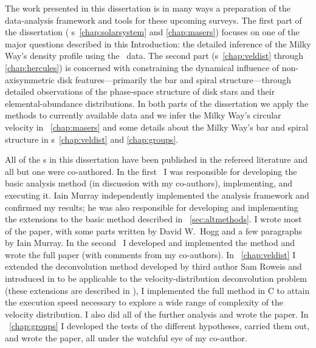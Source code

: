 The work presented in this dissertation is in many ways a preparation
of the data-analysis framework and tools for these upcoming
surveys. The first part of the dissertation (\chaptername
s~\ref{chap:solarsystem} and \ref{chap:masers}) focuses on one of the
major questions described in this Introduction: the detailed inference
of the Milky Way's density profile using the \Gaia\ data. The second
part (\chaptername s~\ref{chap:veldist} through \ref{chap:hercules})
is concerned with constraining the dynamical influence of
non-axisymmetric disk features---primarily the bar and spiral
structure---through detailed observations of the phase-space structure
of disk stars and their elemental-abundance distributions. In both
parts of the dissertation we apply the methods to currently available
data and we infer the Milky Way's circular velocity
in \chaptername~\ref{chap:masers} and some details about the Milky
Way's bar and spiral structure in \chaptername s~\ref{chap:veldist}
and \ref{chap:groups}.

All of the \chaptername s in this dissertation have been published in
the refereed literature and all but one were co-authored. In the
first \chaptername\ I was responsible for developing the basic
analysis method (in discussion with my co-authors), implementing, and
executing it. Iain Murray independently implemented the analysis
framework and confirmed my results; he was also responsible for
developing and implementing the extensions to the basic method
described in \sectionname~\ref{sec:altmethods}. I wrote most of the
paper, with some parts written by David W.~Hogg and a few paragraphs
by Iain Murray. In the second \chaptername\ I developed and
implemented the method and wrote the full paper (with comments from my
co-authors). In \chaptername~\ref{chap:veldist} I extended the
deconvolution method developed by third author Sam Roweis and
introduced in \citet{2005ApJ...629..268H} to be applicable to the
velocity-distribution deconvolution problem (these extensions are
described in \citealt{BovyXD}), I implemented the full method in C to
attain the execution speed necessary to explore a wide range of
complexity of the velocity distribution. I also did all of the further
analysis and wrote the paper. In \chaptername~\ref{chap:groups} I
developed the tests of the different hypotheses, carried them out, and
wrote the paper, all under the watchful eye of my co-author.
